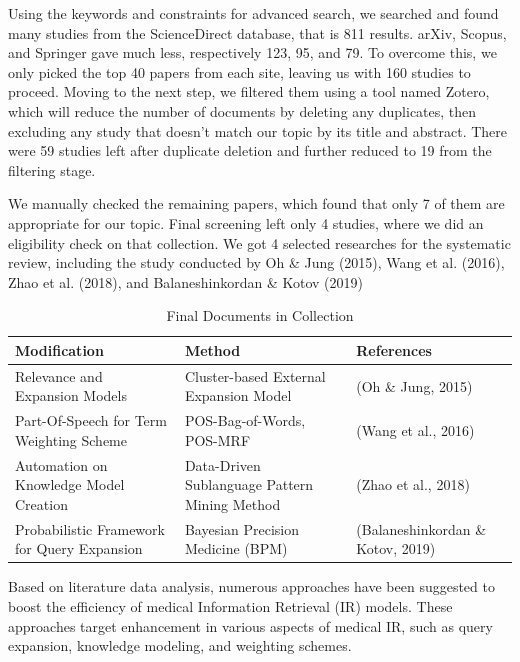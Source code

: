 \documentclass[conference]{IEEEtran}
\begin{document}
Using the keywords and constraints for advanced search, we searched and found many studies from the ScienceDirect database, that is 811 results. arXiv, Scopus, and Springer gave much less, respectively 123, 95, and 79. To overcome this, we only picked the top 40 papers from each site, leaving us with 160 studies to proceed. Moving to the next step, we filtered them using a tool named Zotero, which will reduce the number of documents by deleting any duplicates, then excluding any study that doesn't match our topic by its title and abstract. There were 59 studies left after duplicate deletion and further reduced to 19 from the filtering stage.

We manually checked the remaining papers, which found that only 7 of them are appropriate for our topic. Final screening left only 4 studies, where we did an eligibility check on that collection. We got 4 selected researches for the systematic review, including the study conducted by Oh \& Jung (2015), Wang et al. (2016), Zhao et al. (2018), and Balaneshinkordan \& Kotov (2019)

\begin{table}[htbp!]
    \centering
    \caption{Final Documents in Collection}
    \begin{tabular}{|>{\centering}m{2.5cm}|>{\centering}m{2.5cm}|>{\centering\arraybackslash}m{2.5cm}|}
        \hline
        \textbf{Modification} & \textbf{Method} & \textbf{References} \\
        \hline
        Relevance and Expansion Models & Cluster-based External Expansion Model & (Oh \& Jung, 2015) \\
        \hline
        Part-Of-Speech for Term Weighting Scheme & POS-Bag-of-Words, POS-MRF & (Wang et al., 2016) \\
        \hline
        Automation on Knowledge Model Creation & Data-Driven Sublanguage Pattern Mining Method & (Zhao et al., 2018) \\
        \hline
        Probabilistic Framework for Query Expansion & Bayesian Precision Medicine (BPM) & (Balaneshinkordan \& Kotov, 2019) \\
        \hline
    \end{tabular}
    \label{table:PRISMA-Result}
\end{table}

Based on literature data analysis, numerous approaches have been suggested to boost the efficiency of medical Information Retrieval (IR) models. These approaches target enhancement in  various aspects of medical IR, such as query expansion, knowledge modeling, and weighting schemes.
\end{document}

